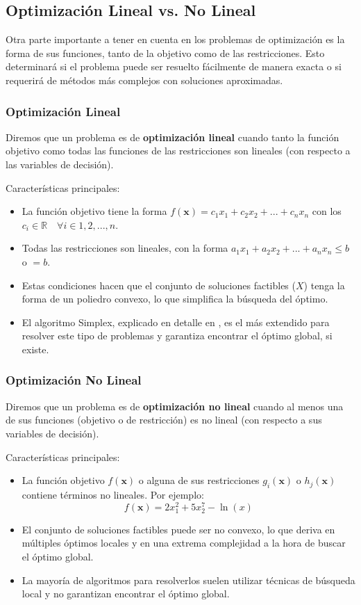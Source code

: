 \documentclass[12pt,a4paper]{book}
\begin{document}
\subsection{Optimización Lineal vs. No Lineal}

Otra parte importante a tener en cuenta en los problemas de optimización es la forma de sus funciones, tanto de la objetivo como de las restricciones. Esto determinará si el problema puede ser resuelto fácilmente de manera exacta o si requerirá de métodos más complejos con soluciones aproximadas.

\subsubsection{Optimización Lineal}
Diremos que un problema es de \textbf{optimización lineal} cuando tanto la función objetivo como todas las funciones de las restricciones son lineales (con respecto a las variables de decisión). 

Características principales:
\begin{itemize}
    \item La función objetivo tiene la forma $f(\mathbf{x})=c_1x_1+c_2x_2+...+c_nx_n$ con los $c_i \in \mathbb{R} \quad \forall i \in 1,2,...,n$.
    \item Todas las restricciones son lineales, con la forma $a_1x_1+a_2x_2+...+a_nx_n\leq b$ o $=b$.
    \item Estas condiciones hacen que el conjunto de soluciones factibles ($X$) tenga la forma de un poliedro convexo, lo que simplifica la búsqueda del óptimo.
    \item El algoritmo Simplex, explicado en detalle en \cite{Dantzig1951}, es el más extendido para resolver este tipo de problemas y garantiza encontrar el óptimo global, si existe.
\end{itemize}

\subsubsection{Optimización No Lineal}
Diremos que un problema es de \textbf{optimización no lineal} cuando al menos una de sus funciones (objetivo o de restricción) es no lineal (con respecto a sus variables de decisión). 

Características principales:
\begin{itemize}
    \item La función objetivo $f(\mathbf{x})$ o alguna de sus restricciones $g_i(\mathbf{x})$ o $h_j(\mathbf{x})$ contiene términos no lineales. Por ejemplo:
    $$f(\mathbf{x})=2x_1^2+5x_2^7-\ln(x)$$
    \item El conjunto de soluciones factibles puede ser no convexo, lo que deriva en múltiples óptimos locales y en una extrema complejidad a la hora de buscar el óptimo global.
    \item La mayoría de algoritmos para resolverlos suelen utilizar técnicas de búsqueda local y no garantizan encontrar el óptimo global.
\end{itemize}
\end{document}

